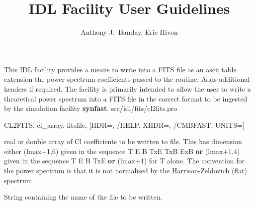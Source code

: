



\sloppy



\title{\healpix IDL Facility User Guidelines}
 \section[cl2fits]{ }
\label{idl:cl2fits}
\author{Anthony J.~Banday, Eric Hivon}




\begin{facility}
{This IDL facility provides a means to
write into a FITS file as an ascii table extension the power 
spectrum coefficients passed to the routine. Adds additional
headers if required. The facility is primarily intended to allow the
user to write a theoretical power spectrum into a FITS file in 
the correct format to be ingested by the \healpix simulation facility 
\textbf{synfast}.
}
{src/idl/fits/cl2fits.pro}
\end{facility}

\begin{IDLformat}
{CL2FITS, cl\_array, fitsfile, [HDR=, /HELP, XHDR=, /CMBFAST, UNITS=]}
\end{IDLformat}

\begin{qualifiers}
  \begin{qulist}{} %
    \item[cl\_array] real or double array of Cl coefficients to be written to
      file. This has dimension either (lmax+1,6) given in the sequence T E B
      TxE TxB ExB {\bf or} (lmax+1,4) given in the sequence T E B
      TxE {\bf or} (lmax+1) for T alone. The convention for the power spectrum is that it is not
      normalised by the Harrison-Zeldovich (flat) spectrum.
    \item[fitsfile] String containing the name of the file to be written.
  \end{qulist}
\end{qualifiers}

